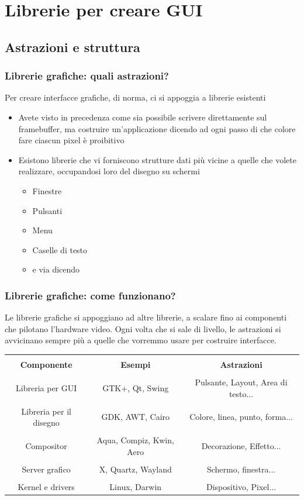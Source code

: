 \documentclass{beamer}
\begin{document}
\section{Librerie per creare GUI}
\subsection{Astrazioni e struttura}

\begin{frame}
\frametitle{Librerie grafiche: quali astrazioni?}
Per creare interfacce grafiche, di norma, ci si appoggia a librerie esistenti
\begin{itemize}
 \item Avete visto in precedenza come sia possibile scrivere direttamente sul framebuffer, ma costruire un'applicazione dicendo ad ogni passo di che colore fare ciascun pixel è proibitivo
 \item Esistono librerie che vi forniscono strutture dati più vicine a quelle che volete realizzare, occupandosi loro del disegno su schermi
 \begin{itemize}
  \item Finestre
  \item Pulsanti
  \item Menu
  \item Caselle di testo
  \item e via dicendo
 \end{itemize}
\end{itemize}
\end{frame}

\begin{frame}
\frametitle{Librerie grafiche: come funzionano?}
Le librerie grafiche si appoggiano ad altre librerie, a scalare fino ai componenti che pilotano l'hardware video. 
Ogni volta che si sale di livello, le astrazioni si avvicinano sempre più a quelle che vorremmo usare per costruire interfacce.

\scriptsize
\centering
\begin{tabular}{| c | c | c |}
\hline & & \\
\textbf{Componente} & \textbf{Esempi} & \textbf{Astrazioni} \\
\hline & & \\
Libreria per GUI & GTK+, Qt, Swing & Pulsante, Layout, Area di testo... \\
\hline & & \\
Libreria per il disegno & GDK, AWT, Cairo & Colore, linea, punto, forma... \\
\hline & & \\
Compositor & Aqua, Compiz, Kwin, Aero & Decorazione, Effetto... \\
\hline & & \\
Server grafico & X, Quartz, Wayland & Schermo, finestra... \\
\hline & & \\
Kernel e drivers & Linux, Darwin & Dispositivo, Pixel... \\
\hline
\end{tabular}
\end{frame}
\end{document}
